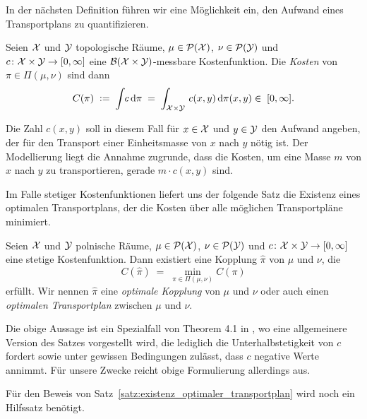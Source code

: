 \documentclass[../thesis/thesis.tex]{subfiles}
\begin{document}
	In der nächsten Definition führen wir eine Möglichkeit ein, den Aufwand eines Transportplans zu quantifizieren.

	\begin{Definition}
		Seien $\mathcal{X}$ und $\mathcal{Y}$ topologische Räume, $\mu \in \mathcal{P}(\mathcal{X})$, $\nu \in \mathcal{P}(\mathcal{Y})$ und $c \colon \mathcal{X} \times \mathcal{Y} \to [0, \infty]$ eine $\mathcal{B}(\mathcal{X} \times \mathcal{Y})$-messbare Kostenfunktion.
		Die \emph{Kosten} von $\pi \in \Pi(\mu, \nu)$ sind dann
		\[ C(\pi) \; \vcentcolon = \; \int_{} \, c \, \mathrm{d}\pi \; = \; \int_{\mathcal{X} \times \mathcal{Y}} \, c(x, y) \, \mathrm{d}\pi(x, y) \in \; [0, \infty] \text{.} \]
	\end{Definition}

	Die Zahl $c(x, y)$ soll in diesem Fall für $x \in \mathcal{X}$ und $y \in \mathcal{Y}$ den Aufwand angeben, der für den Transport einer Einheitsmasse von $x$ nach $y$ nötig ist. Der Modellierung liegt die Annahme zugrunde, dass 
	die Kosten, um eine Masse $m$ von $x$ nach $y$ zu transportieren, gerade $m\cdot c(x, y)$ sind.
	
	Im Falle stetiger Kostenfunktionen liefert uns der folgende Satz die Existenz eines optimalen Transportplans, der die Kosten über alle möglichen Transportpläne minimiert.

	\begin{Satz}
		\label{satz:existenz_optimaler_transportplan}
		Seien $\mathcal{X}$ und $\mathcal{Y}$ polnische Räume, $\mu \in \mathcal{P}(\mathcal{X})$, $\nu \in \mathcal{P}(\mathcal{Y})$ und $c \colon \mathcal{X} \times \mathcal{Y} \to [0, \infty]$ eine stetige 
		Kostenfunktion. Dann existiert eine Kopplung $\hat{\pi}$ von $\mu$ und $\nu$, die 
		\[ C(\hat{\pi}) \; = \; \min_{\pi \in \Pi(\mu, \nu)} C(\pi) \]
		erfüllt. Wir nennen $\hat{\pi}$ eine \emph{optimale Kopplung} von $\mu$ und $\nu$ oder auch einen \emph{optimalen Transportplan} zwischen $\mu$ und $\nu$.
	\end{Satz}

	\begin{Bemerkung}
		Die obige Aussage ist ein Spezialfall von Theorem 4.1 in \cite{Villani.2009}, wo eine allgemeinere Version des Satzes vorgestellt wird, die lediglich die Unterhalbstetigkeit von $c$ fordert 
		sowie unter gewissen Bedingungen zulässt, dass $c$ negative Werte annimmt. Für unsere Zwecke reicht obige Formulierung allerdings aus.
	\end{Bemerkung}

	Für den Beweis von Satz~\ref{satz:existenz_optimaler_transportplan} wird noch ein Hilfssatz benötigt.
\end{document}
